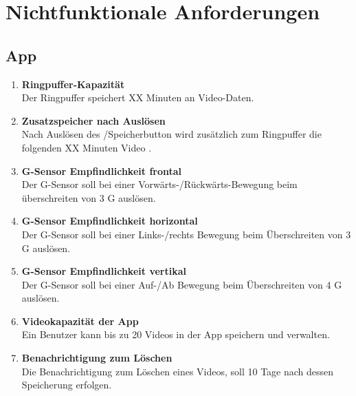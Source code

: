\chapter{Nichtfunktionale Anforderungen}

\section{\gls{App}}
\begin{enumerate}
\renewcommand{\labelenumi}{\textbf{\theenumi}}
\renewcommand{\theenumi}{NA\arabic{enumi}0}
\setcounter{enumi}{99}
\item \textbf{\gls{Ringpuffer}-Kapazität} \hfill\\ Der \gls{Ringpuffer} speichert XX Minuten an Video-Daten.

\item \textbf{Zusatzspeicher nach Auslösen} \hfill\\ Nach Auslösen des /Speicherbutton wird zusätzlich zum \gls{Ringpuffer} die folgenden XX Minuten Video .

\item \label{na:GSensfront}\textbf{\gls{G-Sensor} Empfindlichkeit frontal} \hfill\\  Der \gls{G-Sensor} soll bei einer Vorwärts-/Rückwärts-Bewegung beim überschreiten von 3 G auslösen.

\item \textbf{\gls{G-Sensor} Empfindlichkeit horizontal} \hfill\\  Der \gls{G-Sensor} soll bei einer Links-/rechts Bewegung beim Überschreiten von 3 G auslösen.

\item \label{na:GSensvert}\textbf{\gls{G-Sensor} Empfindlichkeit vertikal} \hfill\\  Der \gls{G-Sensor} soll bei einer Auf-/Ab Bewegung beim Überschreiten von 4 G auslösen.

\item \textbf{Videokapazität der \gls{App}} \hfill\\  Ein Benutzer kann bis zu 20 Videos in der \gls{App} speichern und verwalten.

\item \textbf{Benachrichtigung zum Löschen} \hfill\\  Die Benachrichtigung zum Löschen eines Videos, soll 10 Tage nach dessen Speicherung erfolgen.
\end{enumerate}

